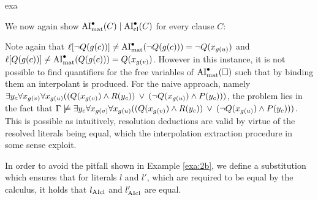 \documentclass[,%
	paper=a4,%
	DIV10, 
	twoside=false,%
	liststotoc,
	bibtotoc,
	draft=false,%
	numbers=noendperiod
]{scrartcl}
\begin{document}
\begin{subtheorem}{exa}
\begin{exa}
\begin{prooftree}

			\prflblid{\resruleres}
			\BinaryInfCm{\square}

		\end{prooftree}

		We now again show $\operatorname{AI}_\mathrm{mat}^\bullet(C) \mid \operatorname{AI}_\mathrm{cl}^\bullet(C)$ for every clause $C$:

		\begin{prooftree}


			\prflblid{\resruleres}

		\end{prooftree}

		Note again that
		$\ell[\lnot Q(g(c))] \neq \operatorname{AI}_\mathrm{mat}^\bullet(\lnot Q(g(c))) = \lnot Q(x_{g(u)})$
		and
		$\ell[Q(g(c))] \neq \operatorname{AI}_\mathrm{mat}^\bullet(Q(g(c))) =  Q(x_{g(v)})$.
		However in this instance, it is not possible to find quantifiers for the free variables of $\operatorname{AI}_\mathrm{mat}^\bullet(\square)$ such that by binding them an interpolant is produced.
		For the naive approach, namely
		$\exists y_c \forall x_{g(v)} \forall x_{g(u)} ((Q(x_{g(v)}) \land R(y_c)) \;\,{\lor}\;\, (\lnot Q(x_{g(u)}) \land P(y_c)))$, 
		the problem lies in the fact that $\Gamma \not\models \exists y_c \forall x_{g(v)} \forall x_{g(u)} ((Q(x_{g(v)}) \land R(y_c)) \;\,{\lor}\;\, (\lnot Q(x_{g(u)}) \land P(y_c)))$.
		This is possible as intuitively, resolution deductions are valid by virtue of the resolved literals being equal, which the interpolation extraction procedure in some sense exploit.
	\end{exa}
\end{subtheorem}

In order to avoid the pitfall shown in Example \ref{exa:2b}, we define a substitution which ensures that for literals $l$ and $l'$, which are required to be equal by the calculus, it holds that $l_{\operatorname{AIcl}}$ and $l'_{\operatorname{AIcl}}$ are equal.
\end{document}
